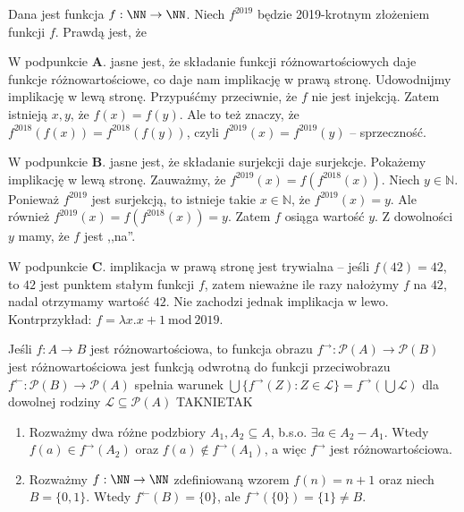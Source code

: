 \begin{solutions}
    \sol Dana jest funkcja $f: \NN \to \NN$. Niech $f^{2019}$ będzie 2019-krotnym złożeniem funkcji $f$. Prawdą jest, że
    
    W podpunkcie $\mathbf{A.}$ jasne jest, że składanie funkcji różnowartościowych daje funkcje różnowartościowe, co daje nam implikację w prawą stronę. Udowodnijmy implikację w lewą stronę. Przypuśćmy przeciwnie, że $f$ nie jest injekcją. Zatem istnieją $x, y$, że $f(x) = f(y)$. Ale to też znaczy, że $f^{2018}(f(x)) = f^{2018}(f(y))$, czyli $f^{2019}(x) = f^{2019}(y)$ -- sprzeczność.

    W podpunkcie $\mathbf{B.}$ jasne jest, że składanie surjekcji daje surjekcje. Pokażemy implikację w lewą stronę. Zauważmy, że $f^{2019}(x) = f(f^{2018}(x))$. Niech $y \in \mathbb{N}$. Ponieważ $f^{2019}$ jest surjekcją, to istnieje takie $x \in \mathbb{N}$, że $f^{2019}(x) = y$. Ale również $f^{2019}(x) = f(f^{2018}(x)) = y$. Zatem $f$ osiąga wartość $y$. Z dowolności $y$ mamy, że $f$ jest ,,na''.

    W podpunkcie $\mathbf{C.}$ implikacja w prawą stronę jest trywialna -- jeśli $f(42) = 42$, to $42$ jest punktem stałym funkcji $f$, zatem nieważne ile razy nałożymy $f$ na $42$, nadal otrzymamy wartość $42$. Nie zachodzi jednak implikacja w lewo. Kontrprzykład: $f = \lambda x . x + 1 \ \text{mod} \ 2019$.

    \sol Jeśli $f : A \rightarrow B$ jest różnowartościowa, to funkcja obrazu $f^{\rightarrow} : \mathcal{P}(A) \rightarrow \mathcal{P}(B)$
    \answerss
    {jest różnowartościowa}
    {jest funkcją odwrotną do funkcji przeciwobrazu $f^{\leftarrow} : \mathcal{P}(B) \rightarrow \mathcal{P}(A)$}
    {spełnia warunek $ \bigcup \{f^{\rightarrow}(Z): Z \in \mathcal{L}\} = f^{\rightarrow} (\bigcup \mathcal{L})$ dla dowolnej rodziny $\mathcal{L} \subseteq \mathcal{P}(A)$}
    {TAK}{NIE}{TAK}

    \begin{enumerate}[\bf A.]
        \item Rozważmy dwa różne podzbiory $A_1, A_2 \subseteq A$, b.s.o. $\exists a \in A_2 - A_1$. Wtedy $f(a) \in f^{\rightarrow}(A_2)$ oraz $f(a) \notin f^{\rightarrow}(A_1)$, a więc $f^{\rightarrow}$ jest różnowartościowa.

        \item Rozważmy $f : \NN \to \NN$ zdefiniowaną wzorem $f(n) = n + 1$ oraz niech $B = \{0, 1\}$. Wtedy $f^{\leftarrow}(B) = \{0\}$, ale $f^{\rightarrow}(\{0\}) = \{1\} \neq B$.


\end{enumerate}
\end{solutions}
